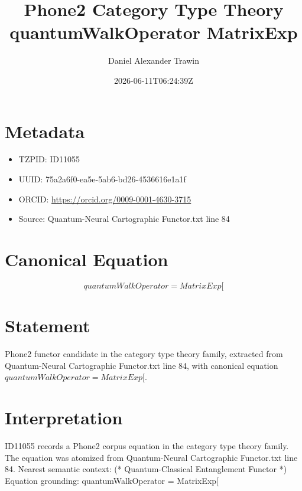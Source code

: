 \documentclass[11pt]{article}
\title{Phone2 Category Type Theory quantumWalkOperator MatrixExp}
\author{Daniel Alexander Trawin}
\date{2026-06-11T06:24:39Z}
\begin{document}
\maketitle
\section*{Metadata}
\begin{itemize}
\item TZPID: ID11055
\item UUID: 75a2a6f0-ea5e-5ab6-bd26-4536616e1a1f
\item ORCID: \url{https://orcid.org/0009-0001-4630-3715}
\item Source: Quantum-Neural Cartographic Functor.txt line 84
\end{itemize}
\section*{Canonical Equation}
\[
quantumWalkOperator = MatrixExp[
\]
\section*{Statement}
Phone2 functor candidate in the category type theory family, extracted from Quantum-Neural Cartographic Functor.txt line 84, with canonical equation $quantumWalkOperator = MatrixExp[$.
\section*{Interpretation}
ID11055 records a Phone2 corpus equation in the category type theory family. The equation was atomized from Quantum-Neural Cartographic Functor.txt line 84. Nearest semantic context: (* Quantum-Classical Entanglement Functor *) Equation grounding: quantumWalkOperator = MatrixExp[
\end{document}

